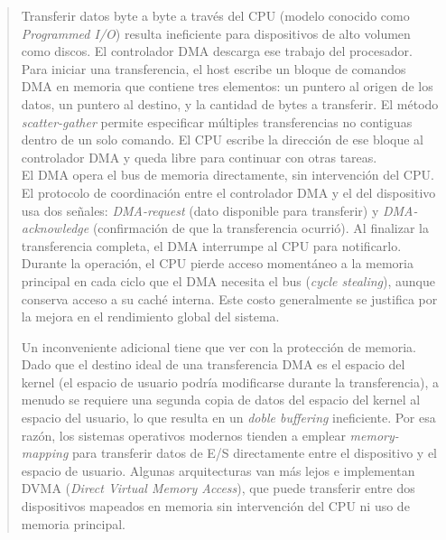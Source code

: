 \documentclass[12pt,letterpaper]{article}
\begin{document}
\begin{quote}
  Transferir datos byte a byte a través del CPU (modelo conocido como \textit{Programmed I/O}) resulta ineficiente para dispositivos de alto volumen como discos. El controlador DMA descarga ese trabajo del procesador.\\
  
  Para iniciar una transferencia, el host escribe un bloque de comandos DMA en memoria que contiene tres
  elementos: un puntero al origen de los datos, un puntero al destino, y la cantidad de bytes a transferir.
  El método \textit{scatter-gather} permite especificar múltiples transferencias no contiguas dentro de un solo
  comando. El CPU escribe la dirección de ese bloque al controlador DMA y queda libre para continuar con otras
  tareas.\\

  El DMA opera el bus de memoria directamente, sin intervención del CPU. El protocolo de coordinación entre el
  controlador DMA y el del dispositivo usa dos señales: \textit{DMA-request} (dato disponible para transferir) y
  \textit{DMA-acknowledge} (confirmación de que la transferencia ocurrió). Al finalizar la transferencia
  completa, el DMA interrumpe al CPU para notificarlo.\\

  Durante la operación, el CPU pierde acceso momentáneo a la memoria principal en cada ciclo que el DMA necesita
  el bus (\textit{cycle stealing}), aunque conserva acceso a su caché interna. Este costo generalmente se
  justifica por la mejora en el rendimiento global del sistema.

  Un inconveniente adicional tiene que ver con la protección de memoria. Dado que el destino ideal de una
  transferencia DMA es el espacio del kernel (el espacio de usuario podría modificarse durante la transferencia),
  a menudo se requiere una segunda copia de datos del espacio del kernel al espacio del usuario, lo que resulta
  en un \textit{doble buffering} ineficiente. Por esa razón, los sistemas operativos modernos tienden a emplear
  \textit{memory-mapping} para transferir datos de E/S directamente entre el dispositivo y el espacio de usuario.
  Algunas arquitecturas van más lejos e implementan DVMA (\textit{Direct Virtual Memory Access}), que puede
  transferir entre dos dispositivos mapeados en memoria sin intervención del CPU ni uso de memoria principal.
\end{quote}
\end{document}
